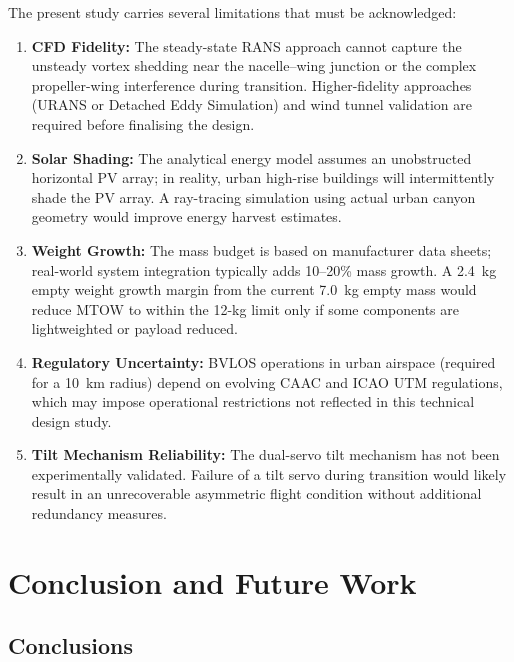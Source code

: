\documentclass[conference]{IEEEtran}
\begin{document}
The present study carries several limitations that must be acknowledged:

\begin{enumerate}
    \item \textbf{CFD Fidelity:} The steady-state RANS approach cannot capture the
          unsteady vortex shedding near the nacelle–wing junction or the complex
          propeller-wing interference during transition.
          Higher-fidelity approaches (URANS or Detached Eddy Simulation) and
          wind tunnel validation are required before finalising the design.

    \item \textbf{Solar Shading:} The analytical energy model assumes an unobstructed
          horizontal PV array; in reality, urban high-rise buildings will intermittently
          shade the PV array.
          A ray-tracing simulation using actual urban canyon geometry would improve
          energy harvest estimates.

    \item \textbf{Weight Growth:} The mass budget is based on manufacturer data sheets;
          real-world system integration typically adds 10--20\% mass growth.
          A \SI{2.4}{kg} empty weight growth margin from the current \SI{7.0}{kg}
          empty mass would reduce MTOW to within the 12-kg limit only if some
          components are lightweighted or payload reduced.

    \item \textbf{Regulatory Uncertainty:} BVLOS operations in urban airspace
          (required for a \SI{10}{km} radius) depend on evolving CAAC and
          ICAO UTM regulations, which may impose operational restrictions
          not reflected in this technical design study.

    \item \textbf{Tilt Mechanism Reliability:} The dual-servo tilt mechanism
          has not been experimentally validated.
          Failure of a tilt servo during transition would likely result in an
          unrecoverable asymmetric flight condition without additional redundancy measures.
\end{enumerate}

\section{Conclusion and Future Work}
\label{sec:conclusion}

\subsection{Conclusions}
\end{document}
